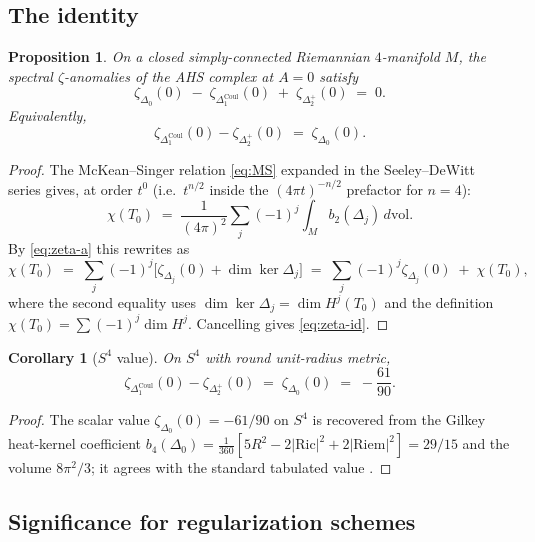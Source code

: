 \documentclass[11pt,letterpaper]{article}
\newtheorem{proposition}[theorem]{Proposition}
\newtheorem{corollary}[theorem]{Corollary}
\theoremstyle{definition}
\newcommand{\Ric}{\mathrm{Ric}}
\newcommand{\dvol}{\,d\mathrm{vol}}
\newcommand{\Lap}{\Delta}
\begin{document}
\subsection{The identity}

\begin{proposition}\label{thm:zeta-identity}
On a closed simply-connected Riemannian $4$-manifold $M$, the spectral $\zeta$-anomalies of the AHS complex at $A=0$ satisfy
\begin{equation}\label{eq:zeta-id}
\zeta_{\Lap_0}(0) \;-\; \zeta_{\Lap_1^{\mathrm{Coul}}}(0) \;+\; \zeta_{\Lap_2^+}(0) \;=\; 0.
\end{equation}
Equivalently,
\begin{equation}\label{eq:zeta-id-2}
\zeta_{\Lap_1^{\mathrm{Coul}}}(0) - \zeta_{\Lap_2^+}(0) \;=\; \zeta_{\Lap_0}(0).
\end{equation}
\end{proposition}

\begin{proof}
The McKean--Singer relation \eqref{eq:MS} expanded in the Seeley--DeWitt series gives, at order $t^0$ (i.e.\ $t^{n/2}$ inside the $(4\pi t)^{-n/2}$ prefactor for $n=4$):
\[
\chi(T_0) \;=\; \frac{1}{(4\pi)^2}\sum_j(-1)^j\int_M b_2(\Lap_j)\dvol.
\]
By \eqref{eq:zeta-a} this rewrites as
\[
\chi(T_0) \;=\; \sum_j(-1)^j\bigl[\zeta_{\Lap_j}(0) + \dim\ker\Lap_j\bigr]
\;=\; \sum_j(-1)^j\zeta_{\Lap_j}(0) \;+\; \chi(T_0),
\]
where the second equality uses $\dim\ker\Lap_j = \dim H^j(T_0)$ and the definition $\chi(T_0)= \sum(-1)^j\dim H^j$. Cancelling gives \eqref{eq:zeta-id}.
\end{proof}

\begin{corollary}[$S^4$ value]\label{cor:S4-value}
On $S^4$ with round unit-radius metric,
\[
\zeta_{\Lap_1^{\mathrm{Coul}}}(0) - \zeta_{\Lap_2^+}(0) \;=\; \zeta_{\Lap_0}(0) \;=\; -\frac{61}{90}.
\]
\end{corollary}

\begin{proof}
The scalar value $\zeta_{\Lap_0}(0) = -61/90$ on $S^4$ is recovered from the Gilkey heat-kernel coefficient $b_4(\Lap_0) = \tfrac{1}{360}[5R^2 - 2|\Ric|^2 + 2|\mathrm{Riem}|^2] = 29/15$ and the volume $8\pi^2/3$; it agrees with the standard tabulated value \cite{Vardi1988}.
\end{proof}

\subsection{Significance for regularization schemes}
\end{document}
